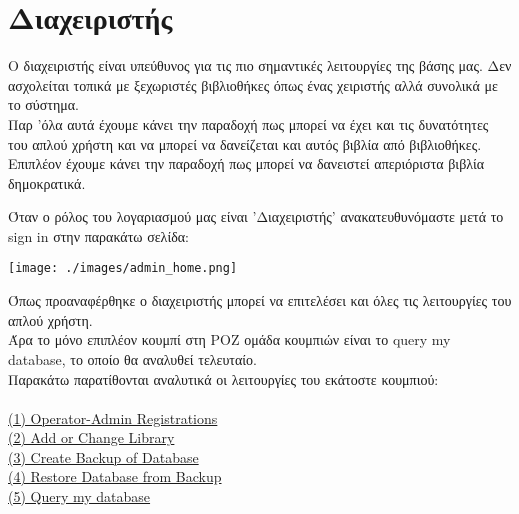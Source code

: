 \documentclass[14pt]{report}
\begin{document}
	\newpage
	\hypertarget{admin-anchor-buttons}{}
	\chapter*{\Large Διαχειριστής} 
	Ο διαχειριστής είναι υπεύθυνος για τις πιο σημαντικές λειτουργίες της βάσης μας. Δεν ασχολείται τοπικά με ξεχωριστές βιβλιοθήκες όπως ένας χειριστής αλλά συνολικά με το σύστημα. \\ Παρ 'όλα αυτά έχουμε κάνει την παραδοχή πως μπορεί να έχει και τις δυνατότητες του απλού χρήστη και να μπορεί να δανείζεται και αυτός βιβλία από βιβλιοθήκες. Επιπλέον έχουμε κάνει την παραδοχή πως μπορεί να δανειστεί απεριόριστα βιβλία δημοκρατικά.
	
	\newpage
	Όταν ο ρόλος του λογαριασμού μας είναι 'Διαχειριστής' ανακατευθυνόμαστε μετά το sign in στην παρακάτω σελίδα: \\
	
	\vspace{\baselineskip}
	
	\texttt{[image: ./images/admin\_home.png]}
	
	\vspace{\baselineskip}
	
	Όπως προαναφέρθηκε ο διαχειριστής μπορεί να επιτελέσει και όλες τις λειτουργίες του απλού χρήστη. \\
	Άρα το μόνο επιπλέον κουμπί στη ΡΟΖ ομάδα κουμπιών είναι το query my database, το οποίο θα αναλυθεί τελευταίο. \\ 
	
	\newpage
	Παρακάτω παρατίθονται αναλυτικά οι λειτουργίες του εκάτοστε κουμπιού: \\ \\
	\hyperlink{a-operator-registrations}{(1) Operator-Admin Registrations} \\
	\hyperlink{a-add-change-library}{(2) Add or Change Library} \\
	\hyperlink{a-create-backup}{(3) Create Backup of Database} \\
	\hyperlink{a-restore-database}{(4) Restore Database from Backup} \\
	\hyperlink{a-query-database}{(5) Query my database} \\
	
\end{document}
